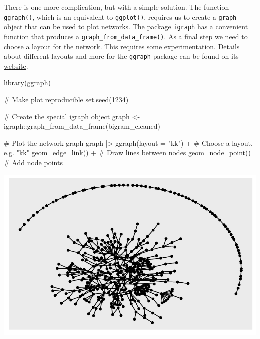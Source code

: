 \documentclass[
  letterpaper,
  DIV=11,
  numbers=noendperiod]{scrreprt}
\newenvironment{Shaded}{\begin{snugshade}}{\end{snugshade}}
\newcommand{\AttributeTok}[1]{\textcolor[rgb]{0.40,0.45,0.13}{#1}}
\newcommand{\CommentTok}[1]{\textcolor[rgb]{0.37,0.37,0.37}{#1}}
\newcommand{\DecValTok}[1]{\textcolor[rgb]{0.68,0.00,0.00}{#1}}
\newcommand{\FunctionTok}[1]{\textcolor[rgb]{0.28,0.35,0.67}{#1}}
\newcommand{\NormalTok}[1]{\textcolor[rgb]{0.00,0.23,0.31}{#1}}
\newcommand{\OtherTok}[1]{\textcolor[rgb]{0.00,0.23,0.31}{#1}}
\newcommand{\SpecialCharTok}[1]{\textcolor[rgb]{0.37,0.37,0.37}{#1}}
\newcommand{\StringTok}[1]{\textcolor[rgb]{0.13,0.47,0.30}{#1}}
\begin{document}
There is one more complication, but with a simple solution. The function
\texttt{ggraph()}, which is an equivalent to \texttt{ggplot()}, requires
us to create a \texttt{graph} object that can be used to plot networks.
The package \texttt{igraph} has a convenient function that produces a
\texttt{graph\_from\_data\_frame()}. As a final step we need to choose a
layout for the network. This requires some experimentation. Details
about different layouts and more for the \texttt{ggraph} package can be
found on its \href{https://ggraph.data-imaginist.com}{website}.

\begin{Shaded}
\begin{Highlighting}[]
\FunctionTok{library}\NormalTok{(ggraph)}

\CommentTok{\# Make plot reproducible}
\FunctionTok{set.seed}\NormalTok{(}\DecValTok{1234}\NormalTok{)}

\CommentTok{\# Create the special igraph object}
\NormalTok{graph }\OtherTok{\textless{}{-}}\NormalTok{ igraph}\SpecialCharTok{::}\FunctionTok{graph\_from\_data\_frame}\NormalTok{(bigram\_cleaned)}

\CommentTok{\# Plot the network graph}
\NormalTok{graph }\SpecialCharTok{|\textgreater{}}
  \FunctionTok{ggraph}\NormalTok{(}\AttributeTok{layout =} \StringTok{"kk"}\NormalTok{) }\SpecialCharTok{+}  \CommentTok{\# Choose a layout, e.g. "kk"}
  \FunctionTok{geom\_edge\_link}\NormalTok{() }\SpecialCharTok{+}       \CommentTok{\# Draw lines between nodes}
  \FunctionTok{geom\_node\_point}\NormalTok{()        }\CommentTok{\# Add node points}
\end{Highlighting}
\end{Shaded}

\includegraphics{14_mixed_methods_files/figure-pdf/ngrams-network-plot-step-one-1.pdf}
\end{document}
